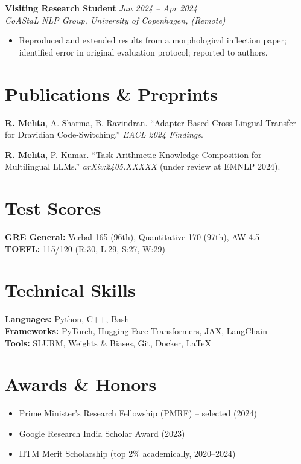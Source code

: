 \documentclass[11pt,a4paper]{article}
\begin{document}
\vspace{4pt}
\noindent\textbf{Visiting Research Student} \hfill \textit{Jan 2024 -- Apr 2024}\\
\textit{CoAStaL NLP Group, University of Copenhagen, (Remote)}
\begin{itemize}
  \item Reproduced and extended results from a morphological inflection paper; identified error in original evaluation protocol; reported to authors.
\end{itemize}

\section{Publications \& Preprints}
\begin{enumerate}[leftmargin=*, label={[\arabic*]}]
  \item \textbf{R. Mehta}, A. Sharma, B. Ravindran. ``Adapter-Based Cross-Lingual Transfer for Dravidian Code-Switching.'' \textit{EACL 2024 Findings}.
  \item \textbf{R. Mehta}, P. Kumar. ``Task-Arithmetic Knowledge Composition for Multilingual LLMs.'' \textit{arXiv:2405.XXXXX} (under review at EMNLP 2024).
\end{enumerate}

\section{Test Scores}
\textbf{GRE General:} Verbal 165 (96th), Quantitative 170 (97th), AW 4.5\\
\textbf{TOEFL:} 115/120 (R:30, L:29, S:27, W:29)

\section{Technical Skills}
\textbf{Languages:} Python, C++, Bash\\
\textbf{Frameworks:} PyTorch, Hugging Face Transformers, JAX, LangChain\\
\textbf{Tools:} SLURM, Weights \& Biases, Git, Docker, LaTeX

\section{Awards \& Honors}
\begin{itemize}
  \item Prime Minister's Research Fellowship (PMRF) -- selected (2024)
  \item Google Research India Scholar Award (2023)
  \item IITM Merit Scholarship (top 2\% academically, 2020--2024)
\end{itemize}
\end{document}
